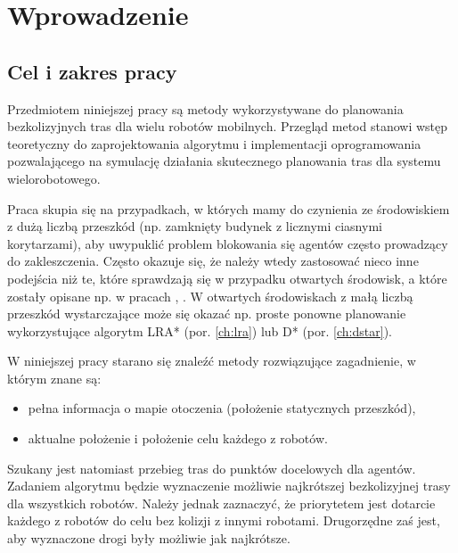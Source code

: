 \chapter{Wprowadzenie}
\label{ch:wprowadzenie}

\section{Cel i zakres pracy}
Przedmiotem niniejszej pracy są metody wykorzystywane do planowania bezkolizyjnych tras dla wielu robotów mobilnych.
Przegląd metod stanowi wstęp teoretyczny do zaprojektowania algorytmu i implementacji oprogramowania pozwalającego na symulację działania skutecznego planowania tras dla systemu wielorobotowego.

Praca skupia się na przypadkach, w których mamy do czynienia ze środowiskiem z dużą liczbą przeszkód (np. zamknięty budynek z licznymi ciasnymi korytarzami), aby uwypuklić problem blokowania się agentów często prowadzący do zakleszczenia. Często okazuje się, że należy wtedy zastosować nieco inne podejścia niż te, które sprawdzają się w przypadku otwartych środowisk, a które zostały opisane np. w pracach \cite{roszkowska}, \cite{siemiatkowska}.
W otwartych środowiskach z małą liczbą przeszkód wystarczające może się okazać np. proste ponowne planowanie wykorzystujące algorytm LRA* (por. \ref{ch:lra}) lub D* (por. \ref{ch:dstar}).

W niniejszej pracy starano się znaleźć metody rozwiązujące zagadnienie, w którym znane są:
\vspace{-1em}
\begin{itemize}[noitemsep]
	\item pełna informacja o mapie otoczenia (położenie statycznych przeszkód),
	\item aktualne położenie i położenie celu każdego z robotów.
\end{itemize}
Szukany jest natomiast przebieg tras do punktów docelowych dla agentów. Zadaniem algorytmu będzie wyznaczenie możliwie najkrótszej bezkolizyjnej trasy dla wszystkich robotów. Należy jednak zaznaczyć, że priorytetem jest dotarcie każdego z robotów do celu bez kolizji z innymi robotami. Drugorzędne zaś jest, aby wyznaczone drogi były możliwie jak najkrótsze.

\clearpage
